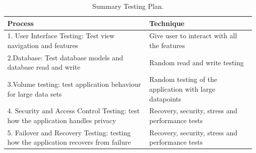 \begin{table}[h!]
  \centering
\caption{Summary Testing Plan.}

\begin{tabular}[t]{|p{8cm}|p{7cm}|} \hline

  \textbf{Process} & \textbf{Technique} \\ \hline 1. User Interface Testing: Test view navigation and features & Give user to interact with all the features \\ \hline 2.Database: Test database models and database read and write & Random read and write testing \\
    \hline 3.Volume testing: test application behaviour for large data sets & Random testing of the application with large datapoints \\
    \hline 4. Security and Access Control Testing: test how the application handles privacy & Recovery, security, stress and
    performance tests \\ \hline 5. Failover and Recovery Testing: testing how the application recovers from failure & Recovery, security, stress and
    performance tests  \\ \hline

\end{tabular}

\label{tab:test-plan}
\end{table}
